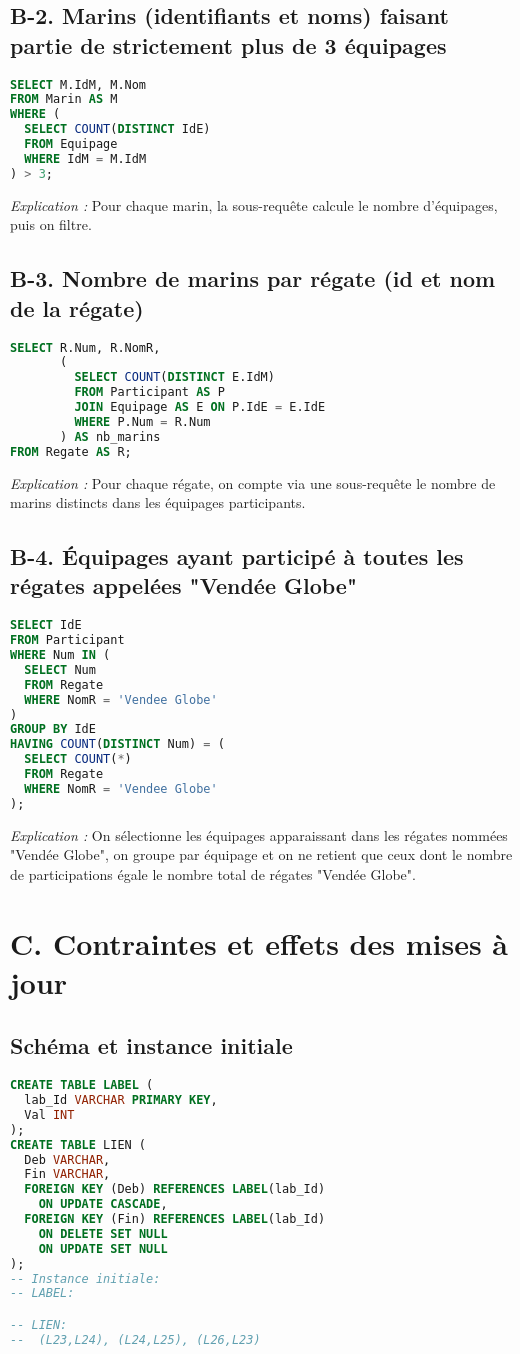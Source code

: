 \documentclass[a4paper,11pt]{article}
\begin{document}
\subsection*{B-2. Marins (identifiants et noms) faisant partie de strictement plus de 3 équipages}
\begin{lstlisting}[language=SQL]
SELECT M.IdM, M.Nom
FROM Marin AS M
WHERE (
  SELECT COUNT(DISTINCT IdE)
  FROM Equipage
  WHERE IdM = M.IdM
) > 3;
\end{lstlisting}
\textit{Explication :} Pour chaque marin, la sous-requête calcule le nombre d'équipages, puis on filtre.

\subsection*{B-3. Nombre de marins par régate (id et nom de la régate)}
\begin{lstlisting}[language=SQL]
SELECT R.Num, R.NomR,
       (
         SELECT COUNT(DISTINCT E.IdM)
         FROM Participant AS P
         JOIN Equipage AS E ON P.IdE = E.IdE
         WHERE P.Num = R.Num
       ) AS nb_marins
FROM Regate AS R;
\end{lstlisting}
\textit{Explication :} Pour chaque régate, on compte via une sous-requête le nombre de marins distincts dans les équipages participants.

\subsection*{B-4. Équipages ayant participé \`a toutes les régates appelées "Vendée Globe"}
\begin{lstlisting}[language=SQL]
SELECT IdE
FROM Participant
WHERE Num IN (
  SELECT Num
  FROM Regate
  WHERE NomR = 'Vendee Globe'
)
GROUP BY IdE
HAVING COUNT(DISTINCT Num) = (
  SELECT COUNT(*)
  FROM Regate
  WHERE NomR = 'Vendee Globe'
);
\end{lstlisting}
\textit{Explication :} On sélectionne les équipages apparaissant dans les régates nommées "Vendée Globe", on groupe par équipage et on ne retient que ceux dont le nombre de participations égale le nombre total de régates "Vendée Globe".

\newpage
\section*{C. Contraintes et effets des mises \`a jour}
\subsection*{Schéma et instance initiale}
\begin{lstlisting}[language=SQL]
CREATE TABLE LABEL (
  lab_Id VARCHAR PRIMARY KEY,
  Val INT
);
CREATE TABLE LIEN (
  Deb VARCHAR,
  Fin VARCHAR,
  FOREIGN KEY (Deb) REFERENCES LABEL(lab_Id)
    ON UPDATE CASCADE,
  FOREIGN KEY (Fin) REFERENCES LABEL(lab_Id)
    ON DELETE SET NULL
    ON UPDATE SET NULL
);
-- Instance initiale:
-- LABEL:

-- LIEN:
--  (L23,L24), (L24,L25), (L26,L23)
\end{lstlisting}
\end{document}
